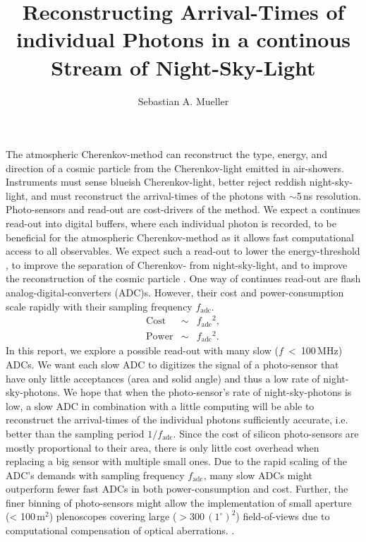 \documentclass{article}%
\title{
    Reconstructing Arrival-Times of individual Photons
    in a continous Stream of Night-Sky-Light
}%
\author{Sebastian A. Mueller}%
\date{}%
\begin{document}
%
\maketitle%

\newcommand{\F}{F_\text{nsb}}
\newcommand{\Ftyp}{F_\text{typical}}
\newcommand{\Apulse}{A_\text{pulse}}
\newcommand{\fadc}{f_\text{adc}}
\newcommand{\fproc}{f_\text{proc}}

\begin{multicols}{2}%
%
The atmospheric Cherenkov-method can reconstruct the type, energy, and direction of a cosmic particle from the Cherenkov-light emitted in air-showers.
%
Instruments must sense blueish Cherenkov-light, better reject reddish night-sky-light, and must reconstruct the arrival-times of the photons with $\sim{}$5\,ns resolution.
%
Photo-sensors and read-out are cost-drivers of the method.
\newline
%
We expect a continues read-out into digital buffers, where each individual photon is recorded, to be beneficial for the atmospheric Cherenkov-method as it allows fast computational access to all observables.
%
We expect such a read-out to lower the energy-threshold \cite{jung2005star}, to improve the separation of Cherenkov- from night-sky-light, and to improve the reconstruction of the cosmic particle \cite{catalano2008single}.
\newline
%
One way of continues read-out are flash analog-digital-converters (ADC)s.
%
However, their cost and power-consumption scale rapidly with their sampling frequency $\fadc{}$.
%
\begin{eqnarray*}
\text{Cost} &\sim& \fadc{}^2,\\
\text{Power} &\sim& \fadc{}^2.
\end{eqnarray*}
%
In this report, we explore a possible read-out with many slow \mbox{($f$ < 100\,MHz)} ADCs.
%
We want each slow ADC to digitizes the signal of a photo-sensor that have only little acceptances (area and solid angle) and thus a low rate of night-sky-photons.
%
We hope that when the photo-sensor's rate of night-sky-photons is low, a slow ADC in combination with a little computing will be able to reconstruct the arrival-times of the individual photons sufficiently accurate, i.e. better than the sampling period $1/\fadc{}$.
%
Since the cost of silicon photo-sensors are mostly proportional to their area, there is only little cost overhead when replacing a big sensor with multiple small ones.
%
Due to the rapid scaling of the ADC's demands with sampling frequency $\fadc{}$, many slow ADCs might outperform fewer fast ADCs in both power-consumption and cost.
\newline
Further, the finer binning of photo-sensors might allow the implementation of small aperture (< 100\,m$^2$) plenoscopes covering large ($> 300\,(1^\circ{})^2$) field-of-views due to computational compensation of optical aberrations. \cite{mueller2019phd}.
%

\end{multicols}
\end{document}
